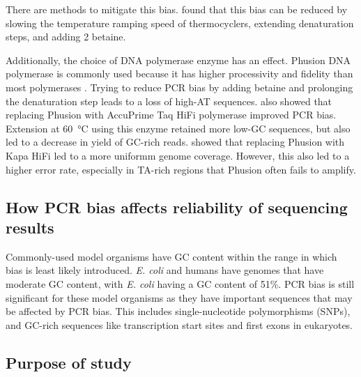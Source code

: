\documentclass[parskip=full, numbers=noenddot]{scrreprt}
\begin{document}
There are methods to mitigate this bias.  \citet{aird_analyzing_2011} found that this bias can be reduced by slowing the temperature ramping speed of thermocyclers, extending denaturation steps, and adding \SI{2}{\Molar} betaine.

Additionally, the choice of DNA polymerase enzyme has an effect.  Phusion DNA polymerase is commonly used because it has higher processivity and fidelity than most polymerases \citep{quail_optimal_2012}. Trying to reduce PCR bias by adding betaine and prolonging the denaturation step leads to a loss of high-AT sequences.  \citet{aird_analyzing_2011} also showed that replacing Phusion with AccuPrime Taq HiFi polymerase improved PCR bias.  Extension at \SI{60}{\celsius} using this enzyme retained more low-GC sequences, but also led to a decrease in yield of GC-rich reads.  \citet{quail_optimal_2012} showed that replacing Phusion with Kapa HiFi led to a more uniformm genome coverage.  However, this also led to a higher error rate, especially in TA-rich regions that Phusion often fails to amplify.

\subsection{How PCR bias affects reliability of sequencing results}
\label{ssec:pcrbias_intro_effects}

Commonly-used model organisms have GC content within the range in which bias is least likely introduced.  \emph{E. coli} and humans have genomes that have moderate GC content, with \emph{E. coli} having a GC content of 51\%.  PCR bias is still significant for these model organisms as they have important sequences that may be affected by PCR bias.  This includes single-nucleotide polymorphisms (SNPs), and GC-rich sequences like transcription start sites and first exons in eukaryotes.  %

\subsection{Purpose of study}
\label{ssec:pcrbias_intro_why}
\end{document}
